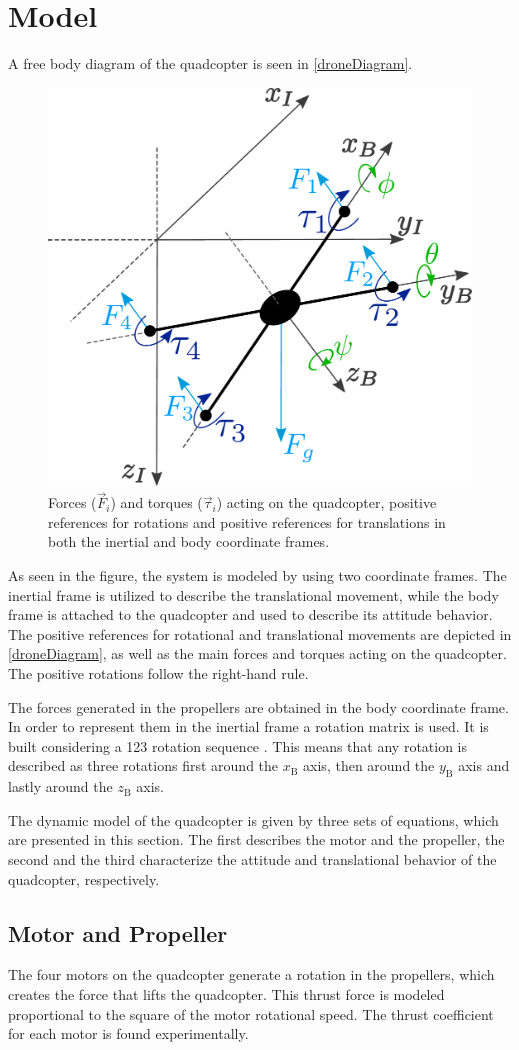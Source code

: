\section{Model}\label{sec:model}
A free body diagram of the quadcopter is seen in \autoref{droneDiagram}. 
\begin{figure}[H]
	\centering
	\includegraphics[width=.4\textwidth]{figures/droneDiagram}
	\caption{Forces ($\vec{F}_i$) and torques ($\vec{\tau}_i$) acting on the quadcopter, positive references for rotations and positive references for translations in both the inertial and body coordinate frames.}
	\label{droneDiagram}
\end{figure}
%
As seen in the figure, the system is modeled by using two coordinate frames. The inertial frame is utilized to describe the translational movement, while the body frame is attached to the quadcopter and used to describe its attitude behavior. The positive references for rotational and translational movements are depicted in \autoref{droneDiagram}, as well as the main forces and torques acting on the quadcopter. The positive rotations follow the right-hand rule.

The forces generated in the propellers are obtained in the body coordinate frame. In order to represent them in the inertial frame a rotation matrix is used. It is built considering a 123 rotation sequence \cite{rotationmatrix}. This means that any rotation is described as three rotations first around the $x_\mathrm{B}$ axis, then around the $y_\mathrm{B}$ axis and lastly around the $z_\mathrm{B}$ axis. 

 
The dynamic model of the quadcopter is given by three sets of equations, which are presented in this section. The first describes the motor and the propeller, the second and the third characterize the attitude and translational behavior of the quadcopter, respectively.

\subsection{Motor and Propeller}
The four motors on the quadcopter generate a rotation in the propellers, which creates the force that lifts the quadcopter. This thrust force is modeled proportional to the square of the motor rotational speed. The thrust coefficient for each motor is found experimentally.
 

